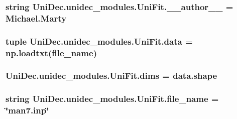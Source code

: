 \subsubsection[{\+\_\+\+\_\+author\+\_\+\+\_\+}]{\setlength{\rightskip}{0pt plus 5cm}string Uni\+Dec.\+unidec\+\_\+modules.\+Uni\+Fit.\+\_\+\+\_\+author\+\_\+\+\_\+ = \textquotesingle{}Michael.\+Marty\textquotesingle{}}\label{namespace_uni_dec_1_1unidec__modules_1_1_uni_fit_ab4f0e5ab0733163c7ee6b3570f72df30}
\hypertarget{namespace_uni_dec_1_1unidec__modules_1_1_uni_fit_abe318bc901f95348802963e243c953c1}{}
\subsubsection[{data}]{\setlength{\rightskip}{0pt plus 5cm}tuple Uni\+Dec.\+unidec\+\_\+modules.\+Uni\+Fit.\+data = np.\+loadtxt({\bf file\+\_\+name})}\label{namespace_uni_dec_1_1unidec__modules_1_1_uni_fit_abe318bc901f95348802963e243c953c1}
\hypertarget{namespace_uni_dec_1_1unidec__modules_1_1_uni_fit_ae696201a252aa3fe0e16b4193036e0f2}{}
\subsubsection[{dims}]{\setlength{\rightskip}{0pt plus 5cm}Uni\+Dec.\+unidec\+\_\+modules.\+Uni\+Fit.\+dims = data.\+shape}\label{namespace_uni_dec_1_1unidec__modules_1_1_uni_fit_ae696201a252aa3fe0e16b4193036e0f2}
\hypertarget{namespace_uni_dec_1_1unidec__modules_1_1_uni_fit_a7e6e2722bb57ed1e194f95225618e654}{}
\subsubsection[{file\+\_\+name}]{\setlength{\rightskip}{0pt plus 5cm}string Uni\+Dec.\+unidec\+\_\+modules.\+Uni\+Fit.\+file\+\_\+name = \char`\"{}man7.\+inp\char`\"{}}\label{namespace_uni_dec_1_1unidec__modules_1_1_uni_fit_a7e6e2722bb57ed1e194f95225618e654}
\hypertarget{namespace_uni_dec_1_1unidec__modules_1_1_uni_fit_ab1b39827451f2bcc9597208bf596f27c}{}
